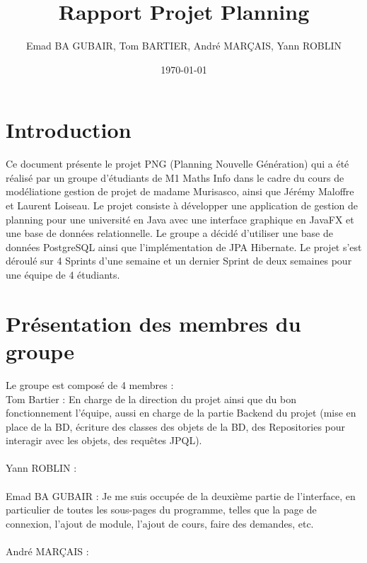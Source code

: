 \documentclass[a4paper,12pt]{article}
\title{Rapport Projet Planning}
\author{Emad BA GUBAIR, Tom BARTIER, André MARÇAIS, Yann ROBLIN}
\date{\today}
\begin{document}
\maketitle

\tableofcontents
\newpage
\section{Introduction}
Ce document présente le projet PNG (Planning Nouvelle Génération) qui a été réalisé par un groupe d'étudiants
de M1 Maths Info dans le cadre du cours de modéliatione gestion de projet de madame Murisasco, ainsi que 
Jérémy Maloffre et Laurent Loiseau. Le projet consiste à développer une application
de gestion de planning pour une université en Java avec une interface graphique en JavaFX et une base de données
relationnelle. Le groupe a décidé d'utiliser une base de données PostgreSQL ainsi que l'implémentation de JPA Hibernate.
Le projet s'est déroulé sur 4 Sprints d'une semaine et un dernier Sprint de deux semaines pour une équipe de 
4 étudiants.
\section{Présentation des membres du groupe}
Le groupe est composé de 4 membres :\\
Tom Bartier : En charge de la direction du projet ainsi que du bon fonctionnement l'équipe, aussi en charge de la partie
Backend du projet (mise en place de la BD, écriture des classes des objets de la BD, des Repositories pour interagir avec les objets, 
des requêtes JPQL).\\\\
Yann ROBLIN :   \\\\%
Emad BA GUBAIR :   Je me suis occupée de la deuxième partie de l’interface, en particulier de toutes les sous-pages du programme, 
telles que la page de connexion, l’ajout de module, l’ajout de cours, faire des demandes, etc.\\\\
André MARÇAIS :  \\\\%
\end{document}
